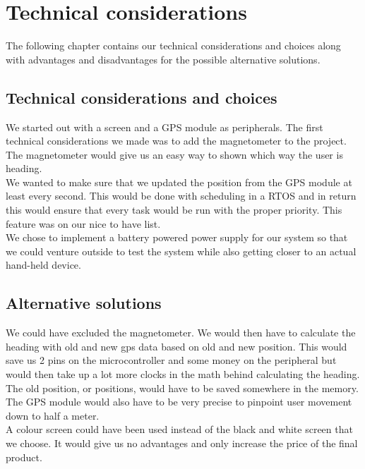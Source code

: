 \chapter{Technical considerations}
The following chapter contains our technical considerations and choices along with advantages and disadvantages for the possible alternative solutions. \\

\section{Technical considerations and choices}
We started out with a screen and a GPS module as peripherals. The first technical considerations we made was to add the magnetometer to the project. The magnetometer would give us an easy way to shown which way the user is heading. \\

We wanted to make sure that we updated the position from the GPS module at least every second. This would be done with scheduling in a RTOS and in return this would ensure that every task would be run with the proper priority. This feature was on our nice to have list.\\

We chose to implement a battery powered power supply for our system so that we could venture outside to test the system while also getting closer to an actual hand-held device. \\

\section{Alternative solutions}
We could have excluded the magnetometer. We would then have to calculate the heading with old and new gps data based on old and new position. This would save us 2 pins on the microcontroller and some money on the peripheral but would then take up a lot more clocks in the math behind calculating the heading. The old position, or positions, would have to be saved somewhere in the memory. The GPS module would also have to be very precise to pinpoint user movement down to half a meter.\\

A colour screen could have been used instead of the black and white screen that we choose. It would give us no advantages and only increase the price of the final product. \\


